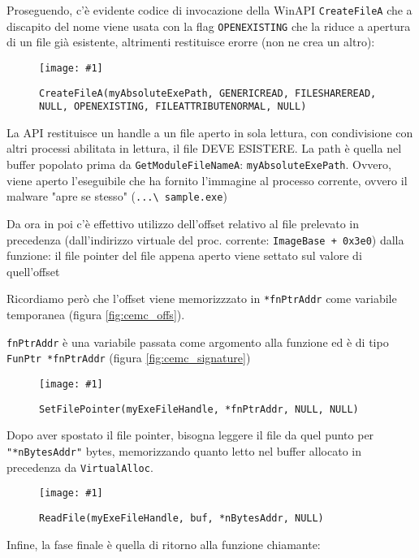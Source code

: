 \documentclass[
    a4paper, %
    11pt %
]{article}
\newcommand{\pic}[4]{\begin{figure}[H]
            \centering
            \texttt{[image: \#1]}
            \caption{#2}
            \label{fig:#1}
            \end{figure}}
\begin{document}
            Proseguendo, c'è evidente codice di invocazione della WinAPI \texttt{CreateFileA} che a discapito del nome
            viene usata con la flag \texttt{OPEN\textunderscore EXISTING} 
            che la riduce a apertura di un file già esistente, altrimenti restituisce erorre (non ne crea un altro):
            \pic{cemc_openexisting}{\texttt{CreateFileA(myAbsoluteExePath, 
            GENERIC\textunderscore READ, FILE\textunderscore SHARE\textunderscore READ, NULL, OPEN\textunderscore EXISTING, FILE\textunderscore ATTRIBUTE\textunderscore NORMAL, NULL)}}{18cm}{10cm}

            La API restituisce un handle a un file aperto in sola lettura, con condivisione con altri processi abilitata
            in lettura, il file DEVE ESISTERE. La path è quella nel buffer
            popolato prima da \texttt{GetModuleFileNameA}: \texttt{myAbsoluteExePath}. Ovvero, viene aperto l'eseguibile
            che ha fornito l'immagine al processo corrente, ovvero il malware "apre se stesso" (\texttt{...\textbackslash 
            sample.exe})

            \pagebreak

            Da ora in poi c'è effettivo utilizzo dell'offset relativo al file prelevato in precedenza (dall'indirizzo virtuale del proc. corrente: \texttt{ImageBase + 0x3e0}) dalla funzione: il
            file pointer del file appena aperto viene settato sul valore di quell'offset 
            
            Ricordiamo però che l'offset viene memorizzzato in \texttt{*fnPtrAddr} come variabile temporanea
            (figura \ref{fig:cemc_offs}).
            
            \texttt{fnPtrAddr} è
            una variabile passata come argomento alla funzione ed è di tipo \texttt{FunPtr *fnPtrAddr} (figura \ref{fig:cemc_signature})
            
            \pic{cemc_filepointer}{\texttt{SetFilePointer(myExeFileHandle, *fnPtrAddr, NULL, NULL)}}{17cm}{9cm}

            Dopo aver spostato il file pointer, bisogna leggere il file da quel punto per \texttt{"*nBytesAddr"} bytes,
            memorizzando quanto letto nel buffer allocato in precedenza da \texttt{VirtualAlloc}.

            \pic{cemc_read}{\texttt{ReadFile(myExeFileHandle, buf, *nBytesAddr, NULL)}}{18cm}{10cm}

            Infine, la fase finale è quella di ritorno alla funzione chiamante:
\end{document}
